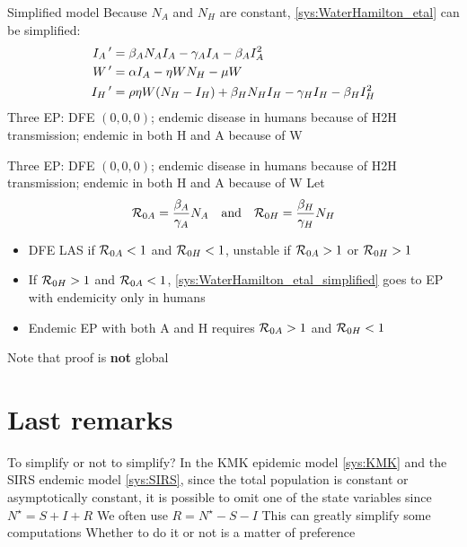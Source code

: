 \documentclass[aspectratio=169]{beamer}\usepackage[]{graphicx}\usepackage[]{xcolor}
\begin{document}
\begin{frame}{Simplified model}
  Because $N_A$ and $N_H$ are constant, \eqref{sys:WaterHamilton_etal} can be simplified:
  \begin{subequations}
    \label{sys:WaterHamilton_etal_simplified}
    \begin{align}
      I_A\,' &= \beta_AN_AI_A-\gamma_AI_A-\beta_AI_A^2 \\
      W\,' &= \alpha I_A-\eta WN_H-\mu W \\
      I_H\,' &= \rho\eta W(N_H-I_H)+\beta_HN_HI_H-\gamma_HI_H-\beta_HI_H^2 
    \end{align}
  \end{subequations}
  \vfill
  Three EP: DFE $(0,0,0)$; endemic disease in humans because of H2H transmission; endemic in both H and A because of W
\end{frame}


\begin{frame}
  Three EP: DFE $(0,0,0)$; endemic disease in humans because of H2H transmission; endemic in both H and A because of W
  \vfill
  Let
  \begin{equation}
    \mathcal{R}_{0A} = \frac{\beta_A}{\gamma_A}N_A\quad\text{and}\quad
    \mathcal{R}_{0H} = \frac{\beta_H}{\gamma_H}N_H
  \end{equation}
  \vfill
  \begin{itemize}
    \item DFE LAS if $\mathcal{R}_{0A}<1$ and $\mathcal{R}_{0H}<1$, unstable if $\mathcal{R}_{0A}>1$ or $\mathcal{R}_{0H}>1$
    \item If $\mathcal{R}_{0H}>1$ and $\mathcal{R}_{0A}<1$, \eqref{sys:WaterHamilton_etal_simplified} goes to EP with endemicity only in humans
    \item Endemic EP with both A and H requires $\mathcal{R}_{0A}>1$ and $\mathcal{R}_{0H}<1$
  \end{itemize}
  Note that proof is \textbf{not} global
\end{frame}

\section{Last remarks}

\begin{frame}{To simplify or not to simplify?}
\bbullet In the KMK epidemic model \eqref{sys:KMK} and the SIRS endemic model \eqref{sys:SIRS}, since the total population is constant or asymptotically constant, it is possible to omit one of the state variables since $N^\star=S+I+R$
\vfill
\bbullet We often use $R=N^\star-S-I$
\vfill
\bbullet This can greatly simplify some computations
\vfill
\bbullet Whether to do it or not is a matter of preference
\end{frame}
\end{document}
